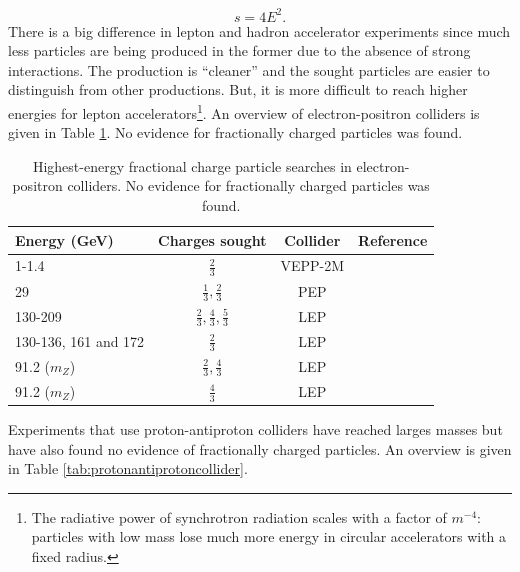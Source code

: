 \begin{equation}
s = 4E^2.
\end{equation}
There is a big difference in lepton and hadron accelerator experiments since much less particles are being produced in the former due to the absence of strong interactions. The production is ``cleaner'' and the sought particles are easier to distinguish from other productions. But, it is more difficult to reach higher energies for lepton accelerators\footnote{The radiative power of synchrotron radiation scales with a factor of $m^{-4}$: particles with low mass lose much more energy in circular accelerators with a fixed radius.}. An overview of electron-positron colliders is given in Table \ref{tab:elecposcollider}. No evidence for fractionally charged particles was found.


\begin{table}[]
\caption{Highest-energy fractional charge particle searches in electron-positron colliders. No evidence for fractionally charged particles was found.}
\label{tab:elecposcollider}
\centering
\begin{tabular}{|l|c|c|c|}
\hline
\rowcolor[HTML]{9B9B9B} 
Energy (GeV) & Charges sought                        & Collider &Reference\\ \hline
1-1.4		 & $\frac{2}{3}$						 & VEPP-2M  & \cite{Bondar:1985sb} \\ \hline
29			 & $\frac{1}{3},\frac{2}{3}$			 & PEP & \cite{Aihara:1984px} \\ \hline		
130-209      & $\frac{2}{3},\frac{4}{3},\frac{5}{3}$ & LEP & \cite{Abbiendi:2003yd}    \\ \hline
130-136, 161 and 172 & $\frac{2}{3}$                 & LEP & \cite{Abreu:1996py}    \\ \hline
91.2 ($m_Z$) & $\frac{2}{3},\frac{4}{3}$             & LEP & \cite{Akers:1995az}    \\ \hline
91.2 ($m_Z$) & $\frac{4}{3}$   	    			     & LEP & \cite{Buskulic:1992mr}  \\ \hline
\end{tabular}
\end{table}

Experiments that use proton-antiproton colliders have reached larges masses but have also found no evidence of fractionally charged particles. An overview is given in Table \ref{tab:protonantiprotoncollider}.


